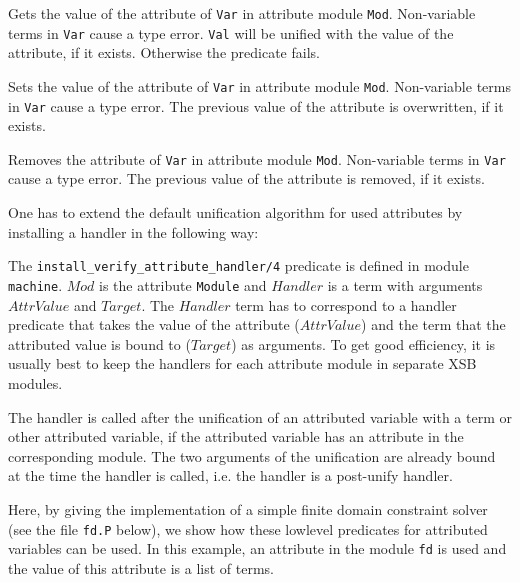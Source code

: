 \begin{description}
%
Gets the value of the attribute of \texttt{Var} in attribute module
\texttt{Mod}. Non-variable terms in \texttt{Var} cause a type
error. \texttt{Val} will be unified with the value of the attribute,
if it exists. Otherwise the predicate fails.

%
Sets the value of the attribute of \texttt{Var} in attribute module
\texttt{Mod}. Non-variable terms in \texttt{Var} cause a type
error. The previous value of the attribute is overwritten, if it
exists.

%
Removes the attribute of \texttt{Var} in attribute module
\texttt{Mod}. Non-variable terms in \texttt{Var} cause a type
error. The previous value of the attribute is removed, if it exists.
\end{description}

One has to extend the default unification algorithm for used
attributes by installing a handler in the following way:


\noindent The
\texttt{install\_verify\_attribute\_handler/4}
predicate is defined in module \texttt{machine}. $Mod$ is the
attribute {\tt Module} and $Handler$ is a term with arguments
$AttrValue$ and $Target$. The $Handler$ term has to correspond to a
handler predicate that takes the value of the attribute ($AttrValue$)
and the term that the attributed value is bound to ($Target$) as
arguments.  To get good efficiency, it is usually best to keep the
handlers for each attribute module in separate XSB modules.

The handler is called after the unification of an attributed variable
with a term or other attributed variable, if the attributed variable
has an attribute in the corresponding module. The two arguments of the
unification are already bound at the time the handler is called,
i.e. the handler is a post-unify handler.

Here, by giving the implementation of a simple finite domain
constraint solver (see the file \texttt{fd.P} below), we show how
these lowlevel predicates for attributed variables can be used.  In
this example, an attribute in the module \texttt{fd} is used and the
value of this attribute is a list of terms.

